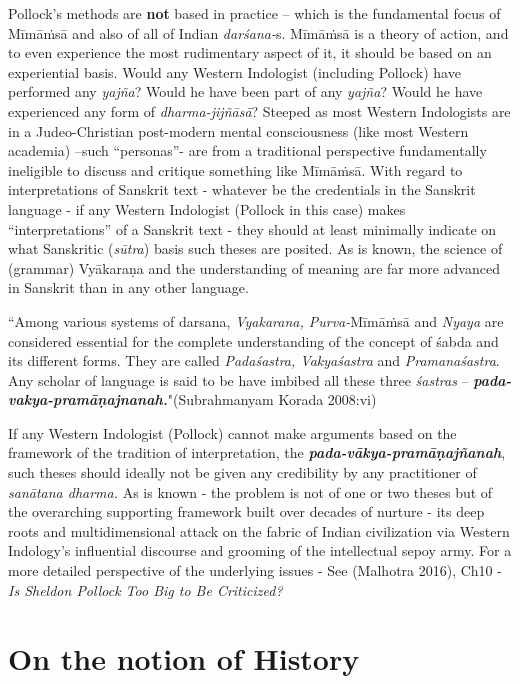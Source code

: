 Pollock’s methods are \textbf{not} based in practice – which is the fundamental focus of Mīmāṁsā and also of all of Indian \textit{darśana-}s. Mīmāṁsā is a theory of action, and to even experience the most rudimentary aspect of it, it should be based on an experiential basis. Would any Western Indologist (including Pollock) have performed any \textit{yajña}? Would he have been part of any \textit{yajña}? Would he have experienced any form of \textit{dharma-jijñāsā}? Steeped as most Western Indologists are in a Judeo-Christian post-modern mental consciousness (like most Western academia) –such “personas”- are from a traditional perspective fundamentally ineligible to discuss and critique something like Mīmāṁsā. With regard to interpretations of Sanskrit text - whatever be the credentials in the Sanskrit language - if any Western Indologist (Pollock in this case) makes “interpretations” of a Sanskrit text - they should at least minimally indicate on what Sanskritic (\textit{sūtra}) basis such theses are posited. As is known, the science of (grammar) Vyākaraṇa and the understanding of meaning are far more advanced in Sanskrit than in any other language.

\begin{myquote}
“Among various systems of darsana, \textit{Vyakarana, Purva-}Mīmāṁsā and \textit{Nyaya} are considered essential for the complete understanding of the concept of śabda and its different forms. They are called \textit{Padaśastra, Vakyaśastra} and \textit{Pramanaśastra}. Any scholar of language is said to be have imbibed all these three \textit{śastras} – \textit{\textbf{pada-vakya-pramāṇajnanah.}}"\hfill (Subrahmanyam Korada 2008:vi)
\end{myquote}

If any Western Indologist (Pollock) cannot make arguments based on the framework of the tradition of interpretation, the \textit{\textbf{pada-vākya-pramāṇajñanah}}, such theses should ideally not be given any credibility by any practitioner of \textit{sanātana dharma.} As is known - the problem is not of one or two theses but of the overarching supporting framework built over decades of nurture - its deep roots and multidimensional attack on the fabric of Indian civilization via Western Indology’s influential discourse and grooming of the intellectual sepoy army. For a more detailed perspective of the underlying issues - See (Malhotra 2016), Ch10 - \textit{Is Sheldon Pollock Too Big to Be Criticized?}


\section*{On the notion of History}


